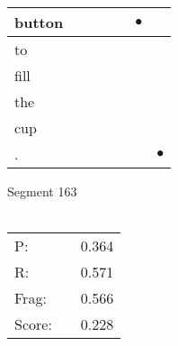 \documentclass[landscape]{article}
\newcommand{\ssp}{\hspace{2pt}}
\newcommand{\mex}{\cellcolor{g}$\bullet$}
\begin{document}
\begin{tabular}{|l|p{10pt}|p{10pt}|p{10pt}|p{10pt}|p{10pt}|p{10pt}|}
\hline
\ssp \cellcolor{ref4}button \ssp&\hspace{2pt}&\hspace{2pt}&\hspace{2pt}&\hspace{2pt}&\hspace{2pt}\mex&\hspace{2pt}\\
\hline
\ssp to \ssp&\hspace{2pt}&\hspace{2pt}&\hspace{2pt}&\hspace{2pt}&\hspace{2pt}&\hspace{2pt}\\
\hline
\ssp fill \ssp&\hspace{2pt}&\hspace{2pt}&\hspace{2pt}&\hspace{2pt}&\hspace{2pt}&\hspace{2pt}\\
\hline
\ssp the \ssp&\hspace{2pt}&\hspace{2pt}&\hspace{2pt}&\hspace{2pt}&\hspace{2pt}&\hspace{2pt}\\
\hline
\ssp cup \ssp&\hspace{2pt}&\hspace{2pt}&\hspace{2pt}&\hspace{2pt}&\hspace{2pt}&\hspace{2pt}\\
\hline
\ssp \cellcolor{ref5}. \ssp&\hspace{2pt}&\hspace{2pt}&\hspace{2pt}&\hspace{2pt}&\hspace{2pt}&\hspace{2pt}\mex\\
\hline
\end{tabular}

\vspace{6pt}
\noindent Segment 163\\\\
\noindent\begin{tabular}{lm{12pt}r}
\hline
P:&&0.364\\
R:&&0.571\\
Frag:&&0.566\\
Score:&&0.228\\
\end{tabular}
\end{document}
